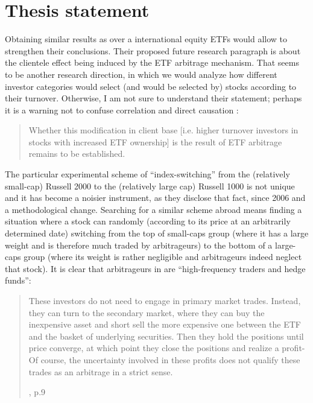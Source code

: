 \documentclass[a4paper, twoside, listof=totoc, toc=sectionentrywithdots]{scrartcl}
\begin{document}
\section{Thesis statement}
Obtaining similar results as \cite{Ben-David2018} over a international equity ETFs would allow to strengthen their conclusions. Their proposed future research paragraph is about the clientele effect being induced by the ETF arbitrage mechanism. That seems to be another research direction, in which we would analyze how different investor categories would select (and would be selected by) stocks according to their turnover. Otherwise, I am not sure to understand their statement; perhaps it is a warning not to confuse correlation and direct causation :
\begin{quotation}
  Whether this modification in client base [i.e. higher turnover investors in stocks with increased ETF ownership] is the result of ETF arbitrage remains to be established.
\end{quotation}
The particular experimental scheme of ``index-switching'' from the (relatively small-cap) Russell 2000 to the (relatively large cap) Russell 1000 is not unique and it has become a noisier instrument, as they disclose that fact, since 2006 and a methodological change. Searching for a similar scheme abroad means finding a situation where a stock can randomly (according to its price at an arbitrarily determined date) switching from the top of small-caps group (where it has a large weight and is therefore much traded by arbitrageurs) to the bottom of a large-caps group (where its weight is rather negligible and arbitrageurs indeed neglect that stock). It is clear that arbitrageurs in \cite{Ben-David2018} are ``high-frequency traders and hedge funds'':
\blockquote[\cite{Ben-David2018}, p.9]{These investors do not need to engage in primary market trades. Instead, they can turn to the secondary market, where they can buy the inexpensive asset and short sell the more expensive one between the ETF and the basket of underlying securities. Then they hold the positions until price converge, at which point they close the positions and realize a profit- Of course, the uncertainty involved in these profits does not qualify these trades as an arbitrage in a strict sense.}
\end{document}
